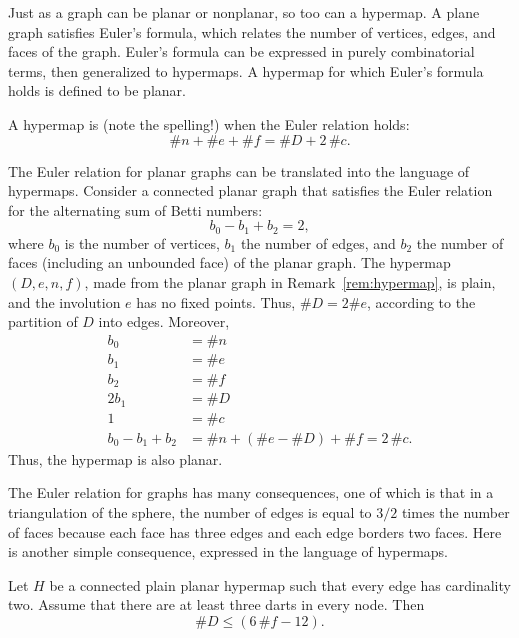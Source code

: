 Just as a graph can be planar or nonplanar, so too can a hypermap.  A
plane graph satisfies Euler's formula, which relates the number of
vertices, edges, and faces of the graph.  Euler's formula can be
expressed in purely combinatorial terms, then generalized to
hypermaps.  A hypermap for which Euler's formula holds is defined to
be planar.  

\begin{definition}[planar]
A hypermap is  (note the
spelling!) when the Euler relation holds:
\[ \# n + \# e + \# f = \# D + 2\, \#c.\] 
%
\end{definition}


\begin{remark}\label{rem:Euler}
The Euler relation for planar graphs can be translated into the
language of hypermaps.  Consider a connected planar graph that
satisfies the Euler relation for the alternating sum of Betti
numbers:
\[ b_0 - b_1 + b_2 = 2,\]  where $b_0$
is the number of vertices, $b_1$ the number of edges, and $b_2$ the
number of faces (including an unbounded face) of the planar
graph. The hypermap $(D,e,n,f)$, made from the planar graph in
Remark~\ref{rem:hypermap}, is plain, and the involution $e$ has no fixed points.  
Thus, $\# D = 2\#e$, according to the partition of $D$ into edges.  Moreover,
\begin{align*}
b_0 &= \# n\\
b_1 &= \# e\\
b_2 &= \# f\\
2b_1 &= \# D\\
1 &= \#c\\
b_0 - b_1 + b_2  &= \# n + (\#e - \#D) + \# f = 2\,\# c.
\end{align*}
Thus, the hypermap is also planar.
\end{remark}


The Euler relation for graphs has many consequences, one of which is
 that in a triangulation of the sphere, the number of
edges is equal to $3/2$ times the number of faces because each face
has three edges and each edge borders two faces.  Here is another simple
consequence, expressed in the language of hypermaps.

\begin{lemma}\label{lemma:dart-upper} 
Let $H$ be a connected plain planar hypermap such that every edge
has cardinality two.  Assume that there are at least three darts in
every node.  Then
\[ 
\# D \le (6\, \#f - 12).
\] 
\end{lemma}
%

